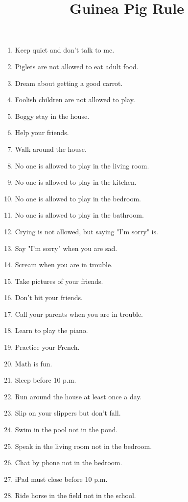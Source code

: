\documentclass{article}
\begin{document}
\title{Guinea Pig Rule}
\maketitle


\begin{multicols}{2}

\begin{enumerate}
\item Keep quiet and don't talk to me.
\item Piglets are not allowed to eat adult food.
\item Dream about getting a good carrot.
\item Foolish children are not allowed to play.
\item Boggy stay in the house.
\item Help your friends.
\item Walk around the house.
\item No one is allowed to play in the living room.
\item No one is allowed to play in the kitchen.
\item No one is allowed to play in the bedroom.
\item No one is allowed to play in the bathroom.
\item Crying is not allowed, but saying "I'm sorry" is.
\item Say "I'm sorry" when you are sad.
\item Scream when you are in trouble.
\item Take pictures of your friends.
\item Don't bit your friends.
\item Call your parents when you are in trouble.
\item Learn to play the piano.
\item Practice your French.
\item Math is fun.
\item Sleep before 10 p.m.
\item Run around the house at least once a day.
\item Slip on your slippers but don't fall.
\item Swim in the pool not in the pond.
\item Speak in the living room not in the bedroom.
\item Chat by phone not in the bedroom.
\item iPad must close before 10 p.m.
\item Ride horse in the field not in the school.

\end{enumerate}
\end{multicols}
\end{document}
